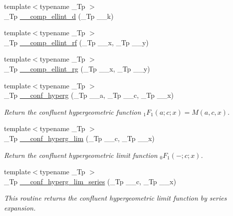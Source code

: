 \begin{DoxyCompactItemize}
{\footnotesize template$<$typename \+\_\+\+Tp $>$ }\\\+\_\+\+Tp \hyperlink{namespacestd_1_1____detail_add5220a1ab03915e4a45dc547bb8eef6}{\+\_\+\+\_\+comp\+\_\+ellint\+\_\+d} (\+\_\+\+Tp \+\_\+\+\_\+k)
\item 
{\footnotesize template$<$typename \+\_\+\+Tp $>$ }\\\+\_\+\+Tp \hyperlink{namespacestd_1_1____detail_a41ecec8820344d3575b464ecd4db5171}{\+\_\+\+\_\+comp\+\_\+ellint\+\_\+rf} (\+\_\+\+Tp \+\_\+\+\_\+x, \+\_\+\+Tp \+\_\+\+\_\+y)
\item 
{\footnotesize template$<$typename \+\_\+\+Tp $>$ }\\\+\_\+\+Tp \hyperlink{namespacestd_1_1____detail_a31bb5a6e359c88b5bece8dd73f76a2f9}{\+\_\+\+\_\+comp\+\_\+ellint\+\_\+rg} (\+\_\+\+Tp \+\_\+\+\_\+x, \+\_\+\+Tp \+\_\+\+\_\+y)
\item 
{\footnotesize template$<$typename \+\_\+\+Tp $>$ }\\\+\_\+\+Tp \hyperlink{namespacestd_1_1____detail_a3cb3151857e9ac01bc442c90301365ee}{\+\_\+\+\_\+conf\+\_\+hyperg} (\+\_\+\+Tp \+\_\+\+\_\+a, \+\_\+\+Tp \+\_\+\+\_\+c, \+\_\+\+Tp \+\_\+\+\_\+x)
\begin{DoxyCompactList}\small\item\em Return the confluent hypergeometric function $ {}_1F_1(a;c;x) = M(a,c,x) $. \end{DoxyCompactList}\item 
{\footnotesize template$<$typename \+\_\+\+Tp $>$ }\\\+\_\+\+Tp \hyperlink{namespacestd_1_1____detail_adc839c2b3faad5d78bf64236c5c7af73}{\+\_\+\+\_\+conf\+\_\+hyperg\+\_\+lim} (\+\_\+\+Tp \+\_\+\+\_\+c, \+\_\+\+Tp \+\_\+\+\_\+x)
\begin{DoxyCompactList}\small\item\em Return the confluent hypergeometric limit function $ {}_0F_1(-;c;x) $. \end{DoxyCompactList}\item 
{\footnotesize template$<$typename \+\_\+\+Tp $>$ }\\\+\_\+\+Tp \hyperlink{namespacestd_1_1____detail_a44b73ec79e0a8cfd1f29a21cb39f2bdc}{\+\_\+\+\_\+conf\+\_\+hyperg\+\_\+lim\+\_\+series} (\+\_\+\+Tp \+\_\+\+\_\+c, \+\_\+\+Tp \+\_\+\+\_\+x)
\begin{DoxyCompactList}\small\item\em This routine returns the confluent hypergeometric limit function by series expansion. \end{DoxyCompactList}\item 

\end{DoxyCompactItemize}
